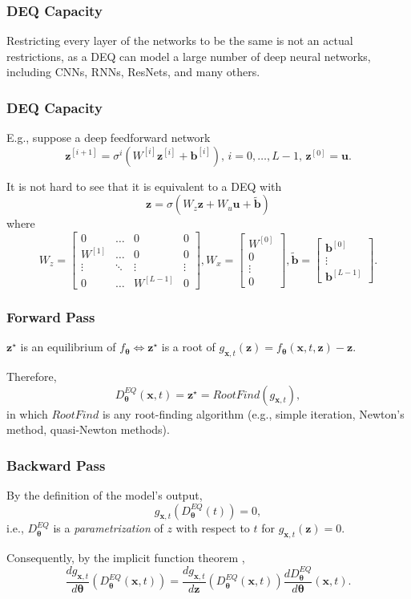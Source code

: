 \documentclass[t]{beamer}
\begin{document}
\begin{frame}
    \frametitle{DEQ Capacity}
    \vfill
    Restricting every layer of the networks to be the same is not an actual restrictions, as a DEQ can model a large number of deep neural networks, including CNNs, RNNs, ResNets, and many others. \pause

\end{frame}

\begin{frame}
    \frametitle{DEQ Capacity}

    E.g., suppose a deep feedforward network \[
	\bm{z}^{[i+1]} = \sigma^{i}\left( W^{[i]}\bm{z}^{[i]} + \bm{b}^{[i]} \right),\,i=0,\ldots,L-1,\,\bm{z}^{[0]} = \bm{u}
    .\] \pause

    It is not hard to see that it is equivalent to a DEQ with \[
	\bm{z} = \sigma\left( W_z\bm{z} + W_u\bm{u} + \bm{\tilde{b}} \right) 
    \] where \[
    W_z=\begin{bmatrix} 
	0 & \hdots & 0 & 0 \\
	W^{[1]} & \hdots & 0 & 0 \\
	\vdots & \ddots & \vdots & \vdots \\
	0 & \hdots & W^{[L-1]} & 0
    \end{bmatrix},
    W_x = \begin{bmatrix} W^{[0]} \\ 0 \\ \vdots \\ 0 \end{bmatrix} ,
    \bm{\tilde{b}} = \begin{bmatrix} \bm{b}^{[0]} \\ \vdots \\ \bm{b}^{[L-1]} \end{bmatrix}
    .\] 
\end{frame}

\begin{frame}
    \frametitle{Forward Pass}
    $\bm{z}^{\star}$ is an equilibrium of $f_{\bm{\theta}} \iff \bm{z}^{\star}$ is a root of $g_{\bm{x},t}(\bm{z}) = f_{\bm{\theta}}(\bm{x},t,\bm{z}) - \bm{z}$.
    \linebreak \pause

    Therefore, \[
	D^{EQ}_{\bm{\theta}}(\bm{x},t) = \bm{z}^{\star} = RootFind(g_{\bm{x},t})
    ,\] in which $RootFind$ is any root-finding algorithm (e.g., simple iteration, Newton's method, quasi-Newton methods).
\end{frame}

\begin{frame}
    \frametitle{Backward Pass}
    By the definition of the model's output, \[
	g_{\bm{x},t}(D^{EQ}_{\bm{\theta}}(t)) = 0
    ,\] i.e., $D^{EQ}_{\bm{\theta}}$ is a \emph{parametrization} of $z$ with respect to $t$ for $g_{\bm{x},t}(\bm{z})=0$.
    \linebreak \pause

    Consequently, by the implicit function theorem \cite{Bai2019}, \[
	\frac{d g_{\bm{x},t}}{d \bm{\theta}}(D^{EQ}_{\bm{\theta}}(\bm{x},t)) = \frac{d g_{\bm{x},t}}{d \bm{z}}(D^{EQ}_{\bm{\theta}}(\bm{x},t)) \frac{d D^{EQ}_{\bm{\theta}}}{d \bm{\theta}}(\bm{x},t)
    .\] 
\end{frame}
\end{document}
